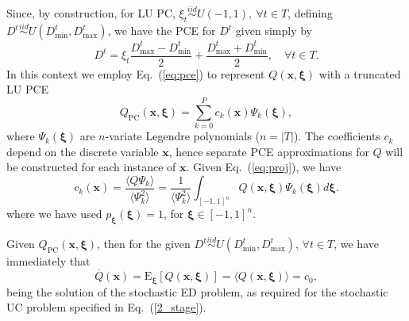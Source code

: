 \documentclass[conference]{IEEEtran}
\newcommand{\be}{\begin{equation}}
\newcommand{\ee}{\end{equation}}
\newcommand{\xivec}{{\boldsymbol{\xi}}}
\begin{document}
Since, by construction, for LU PC, $\xi_t\stackrel{iid}{\sim} U(-1,1),\ \forall t\in T$, defining
$D^t\stackrel{iid}{\sim} U(D^t_{\mathrm{min}},D^t_{\mathrm{max}})$, we have the PCE for $D^t$ given simply by
\be
D^t = \xi_t \frac{D^t_{\mathrm{max}}-D^t_{\mathrm{min}}}{2}
+ \frac{D^t_{\mathrm{max}}+D^t_{\mathrm{min}}}{2}, \quad \forall t\in T.
\ee
In this context we employ Eq.~(\ref{eq:pce}) to represent $Q(\bm{x},\xivec)$ with a truncated LU PCE
\begin{equation}
Q_\mathrm{PC}(\bm{x},\xivec) = \sum_{k=0}^P c_k(\bm{x})\Psi_k(\xivec),
\label{eq:qpce}
\end{equation}
where $\Psi_k(\xivec)$ are $n$-variate Legendre polynomials ($n=|T|$).
The coefficients $c_k$ depend on
the discrete variable $\bm{x}$, hence separate PCE approximations for $Q$
will be constructed for each instance of $\bm{x}$. Given Eq.~(\ref{eq:proj}), we have
\be
c_k(\bm{x}) = \frac{\langle Q\Psi_k\rangle}{\langle \Psi_k^2\rangle}=
\frac{1}{\langle \Psi_k^2\rangle}\int_{[-1,1]^n} Q(\bm{x},\xivec)\Psi_k(\xivec)d\xivec.
\label{eq:gproj}
\ee
where we have used $p_\xivec(\xivec)=1$, for $\xivec\in[-1,1]^n$. 

Given $Q_\mathrm{PC}(\boldsymbol x,\xivec)$,
then for the given $D^t \stackrel{iid}{\sim} U(D^t_\mathrm{min},
D^t_\mathrm{max})$, $\forall t\in T$, we have immediately that
\be
{\overline Q}(\bm{x})=\mathrm{E}_\xivec[Q(\bm{x},\xivec)]=\langle Q(\bm{x},\xivec) \rangle = c_0,
\ee
being the solution of the stochastic ED problem, as required for the stochastic UC problem specified in
Eq.~(\ref{2_stage}). 
\end{document}
